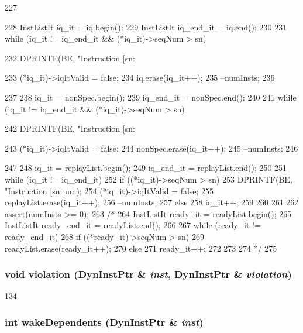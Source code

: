 \begin{DoxyCode}
227 {
228     InstListIt iq_it = iq.begin();
229     InstListIt iq_end_it = iq.end();
230 
231     while (iq_it != iq_end_it && (*iq_it)->seqNum > sn) {
232         DPRINTF(BE, "Instruction [sn:%
      
233         (*iq_it)->iqItValid = false;
234         iq.erase(iq_it++);
235         --numInsts;
236     }
237 
238     iq_it = nonSpec.begin();
239     iq_end_it = nonSpec.end();
240 
241     while (iq_it != iq_end_it && (*iq_it)->seqNum > sn) {
242         DPRINTF(BE, "Instruction [sn:%
      
243         (*iq_it)->iqItValid = false;
244         nonSpec.erase(iq_it++);
245         --numInsts;
246     }
247 
248     iq_it = replayList.begin();
249     iq_end_it = replayList.end();
250 
251     while (iq_it != iq_end_it) {
252         if ((*iq_it)->seqNum > sn) {
253             DPRINTF(BE, "Instruction [sn:%
      um);
254             (*iq_it)->iqItValid = false;
255             replayList.erase(iq_it++);
256             --numInsts;
257         } else {
258             iq_it++;
259         }
260     }
261 
262     assert(numInsts >= 0);
263 /*
264     InstListIt ready_it = readyList.begin();
265     InstListIt ready_end_it = readyList.end();
266 
267     while (ready_it != ready_end_it) {
268         if ((*ready_it)->seqNum > sn) {
269             readyList.erase(ready_it++);
270         } else {
271             ready_it++;
272         }
273     }
274 */
275 }
\end{DoxyCode}
\hypertarget{classBackEnd_1_1InstQueue_ab275fd0e813e657e63aaea4d23629c0c}{
\subsubsection[{violation}]{\setlength{\rightskip}{0pt plus 5cm}void violation ({\bf DynInstPtr} \& {\em inst}, \/  {\bf DynInstPtr} \& {\em violation})}}
\label{classBackEnd_1_1InstQueue_ab275fd0e813e657e63aaea4d23629c0c}



\begin{DoxyCode}
134 { }
\end{DoxyCode}
\hypertarget{classBackEnd_1_1InstQueue_adc3bb738d2526d7074ee2a17b7c34bc4}{
\subsubsection[{wakeDependents}]{\setlength{\rightskip}{0pt plus 5cm}int wakeDependents ({\bf DynInstPtr} \& {\em inst})}}
\label{classBackEnd_1_1InstQueue_adc3bb738d2526d7074ee2a17b7c34bc4}



